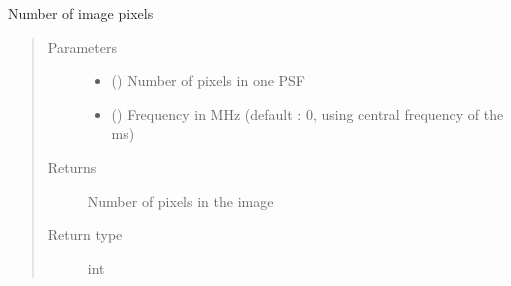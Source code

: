 \documentclass[letterpaper,10pt,english]{sphinxmanual}
\begin{document}
\begin{fulllineitems}
\begin{fulllineitems}
\end{fulllineitems}


\begin{fulllineitems}
\label{\detokenize{paircars:paircars.basic_func.ImageBasic.num_pixels}}
\sphinxAtStartPar
Number of image pixels
\begin{quote}\begin{description}
\item[{Parameters}] \leavevmode\begin{itemize}
\item {} 
\sphinxAtStartPar
{} () \textendash{} Number of pixels in one PSF

\item {} 
\sphinxAtStartPar
{} () \textendash{} Frequency in MHz (default : 0, using central frequency of the ms)

\end{itemize}

\item[{Returns}] \leavevmode
\sphinxAtStartPar
Number of pixels in the image

\item[{Return type}] \leavevmode
\sphinxAtStartPar
int

\end{description}\end{quote}

\end{fulllineitems}


\end{fulllineitems}

\end{document}
